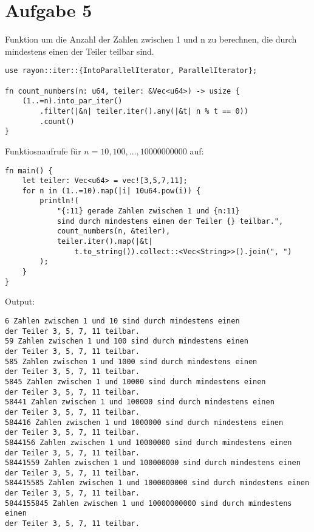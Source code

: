 \documentclass[a4paper]{scrartcl}
\begin{document}
\newpage
\section*{Aufgabe 5}
Funktion um die Anzahl der Zahlen zwischen 1 und n zu berechnen, die durch mindestens einen der Teiler teilbar sind.
\begin{lstlisting}
use rayon::iter::{IntoParallelIterator, ParallelIterator};

fn count_numbers(n: u64, teiler: &Vec<u64>) -> usize {
    (1..=n).into_par_iter()
        .filter(|&n| teiler.iter().any(|&t| n % t == 0))
        .count()
}   
\end{lstlisting}

Funktiosnaufrufe für $ n = 10, 100 , \ldots, 10000000000 $ auf:

\begin{lstlisting}
fn main() {
    let teiler: Vec<u64> = vec![3,5,7,11];
    for n in (1..=10).map(|i| 10u64.pow(i)) {
        println!(
            "{:11} gerade Zahlen zwischen 1 und {n:11} 
            sind durch mindestens einen der Teiler {} teilbar.", 
            count_numbers(n, &teiler), 
            teiler.iter().map(|&t| 
                t.to_string()).collect::<Vec<String>>().join(", ")
        );
    }  
} 
\end{lstlisting}

Output:

\begin{lstlisting}
6 Zahlen zwischen 1 und 10 sind durch mindestens einen
der Teiler 3, 5, 7, 11 teilbar.
59 Zahlen zwischen 1 und 100 sind durch mindestens einen
der Teiler 3, 5, 7, 11 teilbar.
585 Zahlen zwischen 1 und 1000 sind durch mindestens einen
der Teiler 3, 5, 7, 11 teilbar.
5845 Zahlen zwischen 1 und 10000 sind durch mindestens einen
der Teiler 3, 5, 7, 11 teilbar.
58441 Zahlen zwischen 1 und 100000 sind durch mindestens einen
der Teiler 3, 5, 7, 11 teilbar.
584416 Zahlen zwischen 1 und 1000000 sind durch mindestens einen
der Teiler 3, 5, 7, 11 teilbar.
5844156 Zahlen zwischen 1 und 10000000 sind durch mindestens einen
der Teiler 3, 5, 7, 11 teilbar.
58441559 Zahlen zwischen 1 und 100000000 sind durch mindestens einen
der Teiler 3, 5, 7, 11 teilbar.
584415585 Zahlen zwischen 1 und 1000000000 sind durch mindestens einen
der Teiler 3, 5, 7, 11 teilbar.
5844155845 Zahlen zwischen 1 und 10000000000 sind durch mindestens einen
der Teiler 3, 5, 7, 11 teilbar.
\end{lstlisting}      
\end{document}
